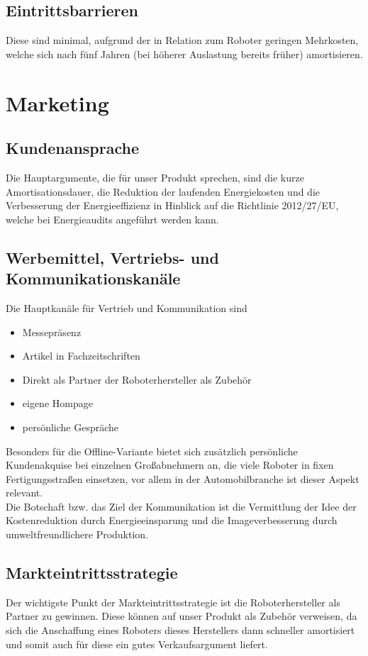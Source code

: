\section{Eintrittsbarrieren}
Diese sind minimal, aufgrund der in Relation zum Roboter geringen Mehrkosten, welche sich nach fünf Jahren (bei höherer Auslastung bereits früher) amortisieren.

\chapter{Marketing}

\section{Kundenansprache}
Die Hauptargumente, die für unser Produkt sprechen, sind die kurze Amortisationsdauer, die Reduktion der laufenden Energiekosten und die Verbesserung der Energieeffizienz in Hinblick auf die Richtlinie 2012/27/EU, welche bei Energieaudits angeführt werden kann.

\section{Werbemittel, Vertriebs- und Kommunikationskanäle}
Die Hauptkanäle für Vertrieb und Kommunikation sind
\begin{itemize}
\item Messepräsenz
\item Artikel in Fachzeitschriften
\item Direkt als Partner der Roboterhersteller als Zubehör
\item eigene Hompage
\item persönliche Gespräche
\end{itemize}
Besonders für die Offline-Variante bietet sich zusätzlich persönliche Kundenakquise bei einzelnen Großabnehmern an, die viele Roboter in fixen Fertigungsstraßen einsetzen, vor allem in der Automobilbranche ist dieser Aspekt relevant.\\
Die Botschaft bzw. das Ziel der Kommunikation ist die Vermittlung der Idee der Kostenreduktion durch Energieeinsparung und die Imageverbesserung durch umweltfreundlichere Produktion.

\section{Markteintrittsstrategie}
Der wichtigste Punkt der Markteintrittsstrategie ist die Roboterhersteller als Partner zu gewinnen. Diese können auf unser Produkt als Zubehör verweisen, da sich die Anschaffung eines Roboters dieses Herstellers dann schneller amortisiert und somit auch für diese ein gutes Verkaufsargument liefert.